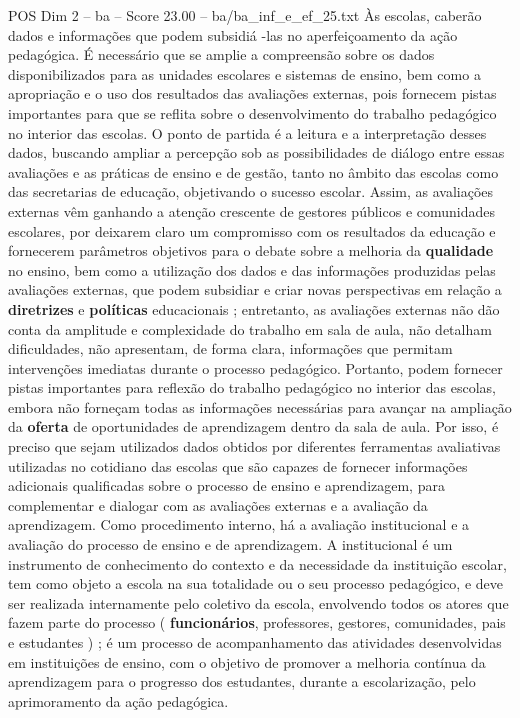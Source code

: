 \begin{textsample}{POS Dim 2 – ba – Score 23.00 – ba/ba\_inf\_e\_ef\_25.txt}
Às escolas, caberão dados e informações que podem subsidiá -las no aperfeiçoamento da ação pedagógica.
É necessário que se amplie a compreensão sobre os dados disponibilizados para as unidades escolares e sistemas de ensino, bem como a apropriação e o uso dos resultados das avaliações externas, pois fornecem pistas importantes para que se reflita sobre o desenvolvimento do trabalho pedagógico no interior das escolas.
O ponto de partida é a leitura e a interpretação desses dados, buscando ampliar a percepção sob as possibilidades de diálogo entre essas avaliações e as práticas de ensino e de gestão, tanto no âmbito das escolas como das secretarias de educação, objetivando o sucesso escolar.
Assim, as avaliações externas vêm ganhando a atenção crescente de gestores públicos e comunidades escolares, por deixarem claro um compromisso com os resultados da educação e fornecerem parâmetros objetivos para o debate sobre a melhoria da \textbf{qualidade} no ensino, bem como a utilização dos dados e das informações produzidas pelas avaliações externas, que podem subsidiar e criar novas perspectivas em relação a \textbf{diretrizes} e \textbf{políticas} educacionais ; entretanto, as avaliações externas não dão conta da amplitude e complexidade do trabalho em sala de aula, não detalham dificuldades, não apresentam, de forma clara, informações que permitam intervenções imediatas durante o processo pedagógico.
Portanto, podem fornecer pistas importantes para reflexão do trabalho pedagógico no interior das escolas, embora não forneçam todas as informações necessárias para avançar na ampliação da \textbf{oferta} de oportunidades de aprendizagem dentro da sala de aula.
Por isso, é preciso que sejam utilizados dados obtidos por diferentes ferramentas avaliativas utilizadas no cotidiano das escolas que são capazes de fornecer informações adicionais qualificadas sobre o processo de ensino e aprendizagem, para complementar e dialogar com as avaliações externas e a avaliação da aprendizagem.
Como procedimento interno, há a avaliação institucional e a avaliação do processo de ensino e de aprendizagem.
A institucional é um instrumento de conhecimento do contexto e da necessidade da instituição escolar, tem como objeto a escola na sua totalidade ou o seu processo pedagógico, e deve ser realizada internamente pelo coletivo da escola, envolvendo todos os atores que fazem parte do processo ( \textbf{funcionários}, professores, gestores, comunidades, pais e estudantes ) ; é um processo de acompanhamento das atividades desenvolvidas em instituições de ensino, com o objetivo de promover a melhoria contínua da aprendizagem para o progresso dos estudantes, durante a escolarização, pelo aprimoramento da ação pedagógica.

\end{textsample}
